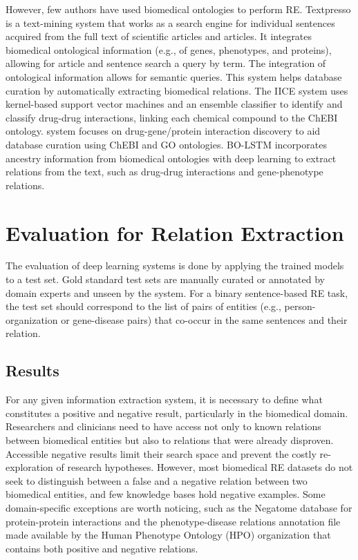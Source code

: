 However, few authors have used biomedical ontologies to perform RE. Textpresso \citep{muller2004textpresso} is a text-mining system that works as a search engine for individual sentences acquired from the full text of scientific articles and articles. It integrates biomedical ontological information (e.g., of genes, phenotypes, and proteins), allowing for article and sentence search a query by term. The integration of ontological information allows for semantic queries. This system helps database curation by automatically extracting biomedical relations. The IICE \citep{lamurias2014identifying} system uses kernel-based support vector machines and an ensemble classifier to identify and classify drug-drug interactions, linking each chemical compound to the ChEBI ontology. \cite{tripodi2017knowledge} system focuses on drug-gene/protein interaction discovery to aid database curation using ChEBI and GO ontologies. BO-LSTM \citep{lamurias2019bo} incorporates ancestry information from biomedical ontologies with deep learning to extract relations from the text, such as drug-drug interactions and gene-phenotype relations. 

\section{Evaluation for Relation Extraction}

The evaluation of deep learning systems is done by applying the trained models to a test set. Gold standard test sets are manually curated or annotated by domain experts and unseen by the system. For a binary sentence-based RE task, the test set should correspond to the list of pairs of entities (e.g., person-organization or gene-disease pairs) that co-occur in the same sentences and their relation.

\subsection{Results}

For any given information extraction system, it is necessary to define what constitutes a positive and negative result, particularly in the biomedical domain. Researchers and clinicians need to have access not only to known relations between biomedical entities but also to relations that were already disproven. Accessible negative results limit their search space and prevent the costly re-exploration of research hypotheses. However, most biomedical RE datasets do not seek to distinguish between a false and a negative relation between two biomedical entities, and few knowledge bases hold negative examples. Some domain-specific exceptions are worth noticing, such as the Negatome database \citep{blohm2014negatome} for protein-protein interactions and the phenotype-disease relations annotation file made available by the Human Phenotype Ontology (HPO) organization \citep{robinson2010human} that contains both positive and negative relations.


